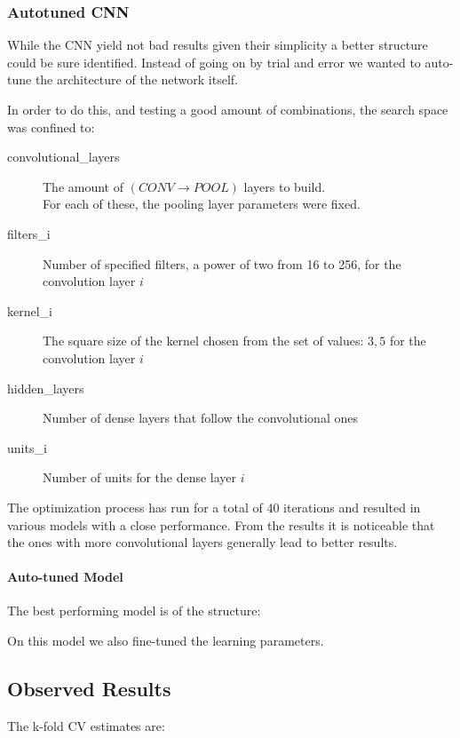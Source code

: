 \subsubsection{Autotuned CNN}
While the CNN yield not bad results given their simplicity a better structure could be sure identified.
Instead of going on by trial and error we wanted to auto-tune the architecture of the network itself.

In order to do this, and testing a good amount of combinations, the search space was confined to:
\begin{description}
    \item [convolutional\_layers] The amount of $(CONV \rightarrow POOL)$ layers to build.\\
    For each of these, the pooling layer parameters were fixed.
    \item[filters\_i] Number of specified filters, a power of two from 16 to 256, for the convolution layer $i$
    \item[kernel\_i] The square size of the kernel chosen from the set of values: ${3,5}$ for the convolution layer $i$
    \item[hidden\_layers] Number of dense layers that follow the convolutional ones
    \item[units\_i] Number of units for the dense layer $i$
\end{description}

The optimization process has run for a total of 40 iterations and resulted in various models with a close performance.
From the results it is noticeable that the ones with more convolutional layers generally lead to better results.

\paragraph{Auto-tuned Model}

The best performing model is of the structure:

On this model we also fine-tuned the learning parameters. %

\subsection{Observed Results}

The k-fold CV estimates are:
